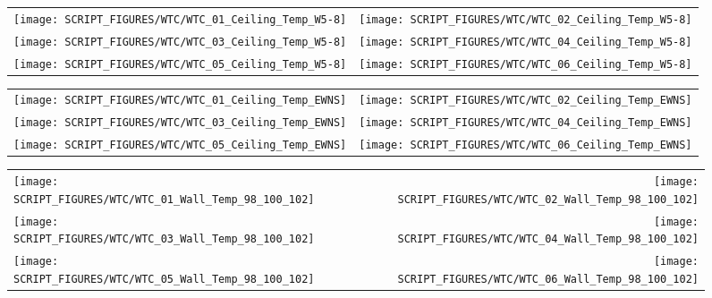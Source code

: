 \begin{figure}[!ht]
\begin{tabular*}{\textwidth}{l@{\extracolsep{\fill}}r}
\texttt{[image: SCRIPT\_FIGURES/WTC/WTC\_01\_Ceiling\_Temp\_W5-8]} &
\texttt{[image: SCRIPT\_FIGURES/WTC/WTC\_02\_Ceiling\_Temp\_W5-8]} \\
\texttt{[image: SCRIPT\_FIGURES/WTC/WTC\_03\_Ceiling\_Temp\_W5-8]} &
\texttt{[image: SCRIPT\_FIGURES/WTC/WTC\_04\_Ceiling\_Temp\_W5-8]} \\
\texttt{[image: SCRIPT\_FIGURES/WTC/WTC\_05\_Ceiling\_Temp\_W5-8]} &
\texttt{[image: SCRIPT\_FIGURES/WTC/WTC\_06\_Ceiling\_Temp\_W5-8]}
\end{tabular*}
\label{NIST_WTC_Ceiling_W5-8}
\end{figure}

\begin{figure}[!ht]
\begin{tabular*}{\textwidth}{l@{\extracolsep{\fill}}r}
\texttt{[image: SCRIPT\_FIGURES/WTC/WTC\_01\_Ceiling\_Temp\_EWNS]} &
\texttt{[image: SCRIPT\_FIGURES/WTC/WTC\_02\_Ceiling\_Temp\_EWNS]} \\
\texttt{[image: SCRIPT\_FIGURES/WTC/WTC\_03\_Ceiling\_Temp\_EWNS]} &
\texttt{[image: SCRIPT\_FIGURES/WTC/WTC\_04\_Ceiling\_Temp\_EWNS]} \\
\texttt{[image: SCRIPT\_FIGURES/WTC/WTC\_05\_Ceiling\_Temp\_EWNS]} &
\texttt{[image: SCRIPT\_FIGURES/WTC/WTC\_06\_Ceiling\_Temp\_EWNS]}
\end{tabular*}
\label{NIST_WTC_Ceiling_EWNS}
\end{figure}

\begin{figure}[!ht]
\begin{tabular*}{\textwidth}{l@{\extracolsep{\fill}}r}
\texttt{[image: SCRIPT\_FIGURES/WTC/WTC\_01\_Wall\_Temp\_98\_100\_102]} &
\texttt{[image: SCRIPT\_FIGURES/WTC/WTC\_02\_Wall\_Temp\_98\_100\_102]} \\
\texttt{[image: SCRIPT\_FIGURES/WTC/WTC\_03\_Wall\_Temp\_98\_100\_102]} &
\texttt{[image: SCRIPT\_FIGURES/WTC/WTC\_04\_Wall\_Temp\_98\_100\_102]} \\
\texttt{[image: SCRIPT\_FIGURES/WTC/WTC\_05\_Wall\_Temp\_98\_100\_102]} &
\texttt{[image: SCRIPT\_FIGURES/WTC/WTC\_06\_Wall\_Temp\_98\_100\_102]}
\end{tabular*}
\label{NIST_WTC_Wall_98_100_102}
\end{figure}


